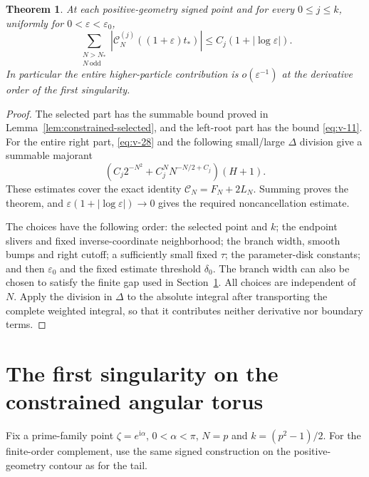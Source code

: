 \documentclass[11pt]{article}
\numberwithin{equation}{section}
\newtheorem{theorem}{Theorem}[section]
\theoremstyle{remark}\newtheorem{remark}[theorem]{Remark}
\newcommand{\ii}{\mathrm i}
\begin{document}
\begin{theorem}\label{thm:constrained-tail}
At each positive-geometry signed point and for every $0\le j\le k$, uniformly
for $0<\varepsilon<\varepsilon_0$,
\begin{equation}\label{eq:logarithmic-absolute-tail}
 \sum_{\substack{N>N_*\\N\ \mathrm{odd}}}
    |\mathcal C_N^{(j)}((1+\varepsilon)t_*)|
       \le C_j(1+|\log\varepsilon|).
\end{equation}
In particular the entire higher-particle contribution is
$o(\varepsilon^{-1})$ at the derivative order of the first
singularity.
\end{theorem}
\begin{proof}
The selected part has the summable bound proved in
Lemma~\ref{lem:constrained-selected}, and the left-root part has
the bound \eqref{eq:v-11}. For the entire right part,
\eqref{eq:v-28} and the following small/large $\Delta$ division
give a summable majorant
\[
 \left(C_j2^{-N^2}+C_j^NN^{-N/2+C_j}\right)(H+1).
\]
These estimates cover the exact identity $\mathcal C_N=F_N+2L_N$.
Summing proves the theorem, and
$\varepsilon(1+|\log\varepsilon|)\to0$ gives the required
noncancellation estimate.

The choices have the following order: the selected point and $k$;
the endpoint slivers and fixed inverse-coordinate neighborhood;
the branch width, smooth bumps and right cutoff; a sufficiently
small fixed $\tau$; the parameter-disk constants; and then
$\varepsilon_0$ and the fixed estimate threshold $\delta_0$.
The branch width can also be chosen to satisfy the finite gap used
in Section~\ref{sec:first-single}. All choices are independent of $N$.
Apply the division in $\Delta$ to the absolute integral after
transporting the complete weighted integral, so that it contributes
neither derivative nor boundary terms.
\end{proof}


\section{The first singularity on the constrained angular torus}
\label{sec:first-single}
Fix a prime-family point $\zeta=e^{\ii\alpha}$,
$0<\alpha<\pi$, $N=p$ and $k=(p^2-1)/2$.
For the finite-order complement, use the same signed construction on
the positive-geometry contour as for the tail.
\end{document}
